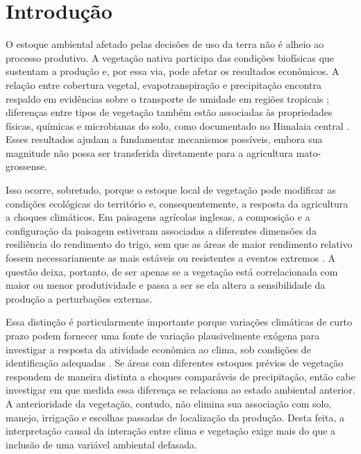 \section*{Introdução}
\label{sec:introducao}

O estoque ambiental afetado pelas decisões de uso da terra não é alheio ao processo produtivo. A vegetação nativa participa das condições biofísicas que sustentam a produção e, por essa via, pode afetar os resultados econômicos. A relação entre cobertura vegetal, evapotranspiração e precipitação encontra respaldo em evidências sobre o transporte de umidade em regiões tropicais \cite{SpracklenEtAl2012}; diferenças entre tipos de vegetação também estão associadas às propriedades físicas, químicas e microbianas do solo, como documentado no Himalaia central \cite{JoshiGarkoti2023}. Esses resultados ajudam a fundamentar mecanismos possíveis, embora sua magnitude não possa ser transferida diretamente para a agricultura mato-grossense.

Isso ocorre, sobretudo, porque o estoque local de vegetação pode modificar as condições ecológicas do território e, consequentemente, a resposta da agricultura a choques climáticos. Em paisagens agrícolas inglesas, a composição e a configuração da paisagem estiveram associadas a diferentes dimensões da resiliência do rendimento do trigo, sem que as áreas de maior rendimento relativo fossem necessariamente as mais estáveis ou resistentes a eventos extremos \cite{RedheadEtAl2020}. A questão deixa, portanto, de ser apenas se a vegetação está correlacionada com maior ou menor produtividade e passa a ser se ela altera a sensibilidade da produção a perturbações externas.

Essa distinção é particularmente importante porque variações climáticas de curto prazo podem fornecer uma fonte de variação plausivelmente exógena para investigar a resposta da atividade econômica ao clima, sob condições de identificação adequadas \cite{DellEtAl2014}. Se áreas com diferentes estoques prévios de vegetação respondem de maneira distinta a choques comparáveis de precipitação, então cabe investigar em que medida essa diferença se relaciona ao estado ambiental anterior. A anterioridade da vegetação, contudo, não elimina sua associação com solo, manejo, irrigação e escolhas passadas de localização da produção. Desta feita, a interpretação causal da interação entre clima e vegetação exige mais do que a inclusão de uma variável ambiental defasada.

